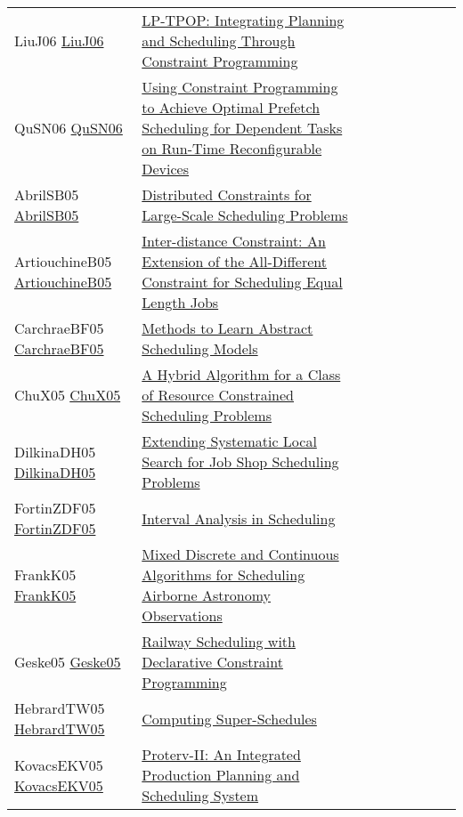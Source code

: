{\begin{longtable}{p{3cm}p{7cm}lllllll}
LiuJ06 \href{https://doi.org/10.1007/11801603\_92}{LiuJ06} &  \href{papers/LiuJ06.pdf}{{LP-TPOP:} Integrating Planning and Scheduling Through Constraint Programming} &  &  &  &  &  &  & \\
QuSN06 \href{https://doi.org/10.1109/ISSOC.2006.321973}{QuSN06} &  \href{papers/QuSN06.pdf}{Using Constraint Programming to Achieve Optimal Prefetch Scheduling for Dependent Tasks on Run-Time Reconfigurable Devices} &  &  &  &  &  &  & \\
AbrilSB05 \href{https://doi.org/10.1007/11564751\_75}{AbrilSB05} &  \href{papers/AbrilSB05.pdf}{Distributed Constraints for Large-Scale Scheduling Problems} &  &  &  &  &  &  & \\
ArtiouchineB05 \href{https://doi.org/10.1007/11564751\_8}{ArtiouchineB05} &  \href{papers/ArtiouchineB05.pdf}{Inter-distance Constraint: An Extension of the All-Different Constraint for Scheduling Equal Length Jobs} &  &  &  &  &  &  & \\
CarchraeBF05 \href{https://doi.org/10.1007/11564751\_80}{CarchraeBF05} &  \href{papers/CarchraeBF05.pdf}{Methods to Learn Abstract Scheduling Models} &  &  &  &  &  &  & \\
ChuX05 \href{https://doi.org/10.1007/11493853\_10}{ChuX05} &  \href{papers/ChuX05.pdf}{A Hybrid Algorithm for a Class of Resource Constrained Scheduling Problems} &  &  &  &  &  &  & \\
DilkinaDH05 \href{https://doi.org/10.1007/11564751\_60}{DilkinaDH05} &  \href{papers/DilkinaDH05.pdf}{Extending Systematic Local Search for Job Shop Scheduling Problems} &  &  &  &  &  &  & \\
FortinZDF05 \href{https://doi.org/10.1007/11564751\_19}{FortinZDF05} &  \href{papers/FortinZDF05.pdf}{Interval Analysis in Scheduling} &  &  &  &  &  &  & \\
FrankK05 \href{https://doi.org/10.1007/11493853\_15}{FrankK05} &  \href{papers/FrankK05.pdf}{Mixed Discrete and Continuous Algorithms for Scheduling Airborne Astronomy Observations} &  &  &  &  &  &  & \\
Geske05 \href{https://doi.org/10.1007/11963578\_10}{Geske05} &  \href{papers/Geske05.pdf}{Railway Scheduling with Declarative Constraint Programming} &  &  &  &  &  &  & \\
HebrardTW05 \href{https://doi.org/10.1007/11564751\_117}{HebrardTW05} &  \href{papers/HebrardTW05.pdf}{Computing Super-Schedules} &  &  &  &  &  &  & \\
KovacsEKV05 \href{https://doi.org/10.1007/11564751\_118}{KovacsEKV05} &  \href{papers/KovacsEKV05.pdf}{Proterv-II: An Integrated Production Planning and Scheduling System} &  &  &  &  &  &  & \\

\end{longtable}}
